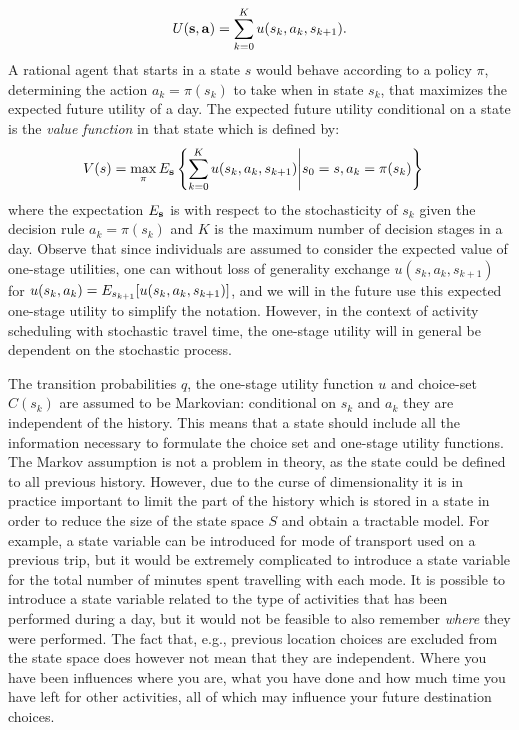 \begin{equation*}
    U(\bs,\ba) = \sum_{k=0}^K u(s_k,a_k,s_{k+1}).
\end{equation*}
A rational agent that starts in a state $s$ would behave according to a policy $\pi$, determining the action $a_k=\pi(s_k)$ to take when in state $s_k$, that maximizes the expected future utility  of a day. The expected future utility conditional on a state is the \emph{value function} in that state which is defined by: 
\begin{equation}\label{eq:vf}
\begin{aligned}
V(s) & = \max_{\pi} E_{\bs} \left\{ \sum_{k=0}^K u(s_k,a_k,s_{k+1})\middle | s_0 = s, a_k=\pi(s_k) \right\}  
\end{aligned}
\end{equation}
where the expectation $E_{\mathbf{s}}$ is with respect to the stochasticity of $s_k$ given the decision rule $a_k=\pi({s_k})$ and $K$ is the maximum number of decision stages in a day. Observe that since individuals are assumed to consider the expected value of one-stage utilities, one can without loss of generality exchange $u(s_k,a_k,s_{k+1})$ for $u(s_k,a_k) = E_{s_{k+1}}[u(s_k,a_k,s_{k+1})]$, and we will in the future use this expected one-stage utility to simplify the notation. However, in the context of activity scheduling with stochastic travel time, the one-stage utility will in general be dependent on the stochastic process.

The transition probabilities $q$, the one-stage utility function $u$ and choice-set $C(s_k)$ are assumed to be Markovian: conditional on $s_k$ and $a_k$ they are independent of the history. This means that a state should include all the information necessary to formulate the choice set and one-stage utility functions. The Markov assumption is not a problem in theory, as the state could be defined to all previous history. However, due to the curse of dimensionality it is in practice important to limit the part of the history which is stored in a state in order to reduce the size of the state space $S$ and obtain a tractable model. For example, a state variable can be introduced for mode of transport used on a previous trip, but it would be extremely complicated to introduce a state variable for the total number of minutes spent travelling with each mode. It is possible to introduce a state variable related to the type of activities that has been performed during a day, but it would not be feasible to also remember \emph{where} they were performed. The fact that, e.g., previous location choices are excluded from the state space does however not mean that they are independent. Where you have been influences where you are, what you have done and how much time you have left for other activities, all of which may influence your future destination choices. 


